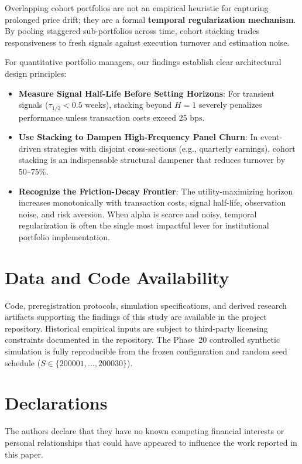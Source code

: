 \documentclass[11pt,a4paper]{article}
\theoremstyle{definition}
\begin{document}
Overlapping cohort portfolios are not an empirical heuristic for capturing prolonged price drift; they are a formal \textbf{temporal regularization mechanism}. By pooling staggered sub-portfolios across time, cohort stacking trades responsiveness to fresh signals against execution turnover and estimation noise.

For quantitative portfolio managers, our findings establish clear architectural design principles:
\begin{itemize}
    \item \textbf{Measure Signal Half-Life Before Setting Horizons}: For transient signals ($\tau_{1/2} < 0.5\text{ weeks}$), stacking beyond $H=1$ severely penalizes performance unless transaction costs exceed $25\text{ bps}$.
    \item \textbf{Use Stacking to Dampen High-Frequency Panel Churn}: In event-driven strategies with disjoint cross-sections (e.g., quarterly earnings), cohort stacking is an indispensable structural dampener that reduces turnover by $50\text{--}75\%$.
    \item \textbf{Recognize the Friction-Decay Frontier}: The utility-maximizing horizon increases monotonically with transaction costs, signal half-life, observation noise, and risk aversion. When alpha is scarce and noisy, temporal regularization is often the single most impactful lever for institutional portfolio implementation.
\end{itemize}


\section*{Data and Code Availability}
Code, preregistration protocols, simulation specifications, and derived research artifacts supporting the findings of this study are available in the project repository. Historical empirical inputs are subject to third-party licensing constraints documented in the repository. The Phase~20 controlled synthetic simulation is fully reproducible from the frozen configuration and random seed schedule ($S \in \{200001, \dots, 200030\}$).

\section*{Declarations}
The authors declare that they have no known competing financial interests or personal relationships that could have appeared to influence the work reported in this paper.



\end{document}
